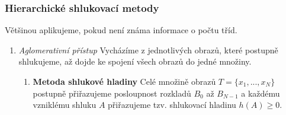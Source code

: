 \subsubsection*{Hierarchické shlukovací metody}
Většinou aplikujeme, pokud není známa informace o počtu tříd.
\begin{enumerate}[label=(\Alph*)]
\item \textit{Aglomerativní přístup}
Vycházíme z jednotlivých obrazů, které postupně shlukujeme, až dojde ke spojení všech obrazů do jedné množiny.
\begin{enumerate}[label=\arabic*.]
\item \textbf{Metoda shlukové hladiny}
Celé množině obrazů $ T = \{x_1, ..., x_N\} $ postupně přiřazujeme posloupnost rozkladů $ B_0 $ až $ B_{N-1} $ a každému vzniklému shluku $ A $ přiřazujeme tzv. shlukovací hladinu $ h(A) \geq 0 $.


\end{enumerate}
\end{enumerate}
